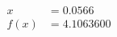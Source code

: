 \documentclass[preview]{standalone}
\begin{document}
\begin{align*}
x &= 0.0566\\f(x) &= 4.1063600
\end{align*}
\end{document}
